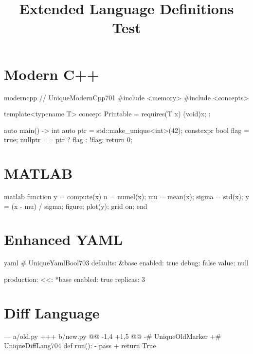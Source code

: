 \documentclass[code=listings]{SUSTechHomework}
\title{Extended Language Definitions Test}
\begin{document}
\maketitle

\section{Modern C++}

\begin{sustechcode}{moderncpp}
// UniqueModernCpp701
#include <memory>
#include <concepts>

template<typename T>
concept Printable = requires(T x) { (void)x; };

auto main() -> int {
    auto ptr = std::make_unique<int>(42);
    constexpr bool flag = true;
    nullptr == ptr ? flag : !flag;
    return 0;
}
\end{sustechcode}

\section{MATLAB}

\begin{sustechcode}{matlab}
function y = compute(x)
    n = numel(x);
    mu = mean(x);
    sigma = std(x);
    y = (x - mu) / sigma;
    figure;
    plot(y);
    grid on;
end
\end{sustechcode}

\section{Enhanced YAML}

\begin{sustechcode}{yaml}
# UniqueYamlBool703
defaults: &base
  enabled: true
  debug:   false
  value:   null

production:
  <<: *base
  enabled: true
  replicas: 3
\end{sustechcode}

\section{Diff Language}

\begin{sustechdiff}
--- a/old.py
+++ b/new.py
@@ -1,4 +1,5 @@
-# UniqueOldMarker
+# UniqueDiffLang704
 def run():
-    pass
+    return True
\end{sustechdiff}
\end{document}
